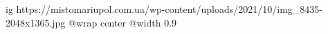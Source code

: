  
 
 
 
 

\ifcmt
  ig https://mistomariupol.com.ua/wp-content/uploads/2021/10/img_8435-2048x1365.jpg
  @wrap center
  @width 0.9
\fi
